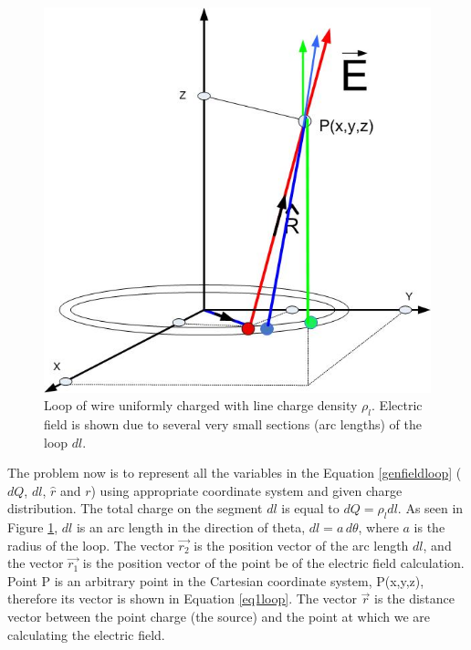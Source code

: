 \documentclass{ximera}
\begin{document}
\begin{figure}[h!]
\begin{center}
\includegraphics[scale=0.5]{../jpg/ringefieldanywheremorecharges.jpg}
\caption{\label{fig:loopAllPts} Loop of wire uniformly charged with line charge density $\rho_l$. Electric field is shown due to several very small sections (arc lengths) of the loop $dl$.}
\end{center}
\end{figure}

The problem now  is to represent all the variables in the Equation \ref{genfieldloop}  ( $dQ$, $dl$, $\hat{r}$ and $r$) using  appropriate coordinate system and given charge distribution.
The  total charge on the segment $dl$ is equal to $dQ=\rho_l dl$. As seen in Figure \ref{fig:loopAllPts}, $dl$ is an arc length in the direction of theta, $dl=a\, d\theta$, where $ a$ is the radius of the loop. The vector $\vec{r_2}$ is the position vector of the arc length $dl$, and the vector $\vec{r_1}$  is the position vector of the point be of the electric field calculation. Point P is an arbitrary point in the Cartesian coordinate system, P(x,y,z), therefore its vector is shown in Equation \ref{eq1loop}.  The vector $\vec{r}$ is the distance vector between the point charge (the source) and the point at which we are calculating the electric field. 
\end{document}
